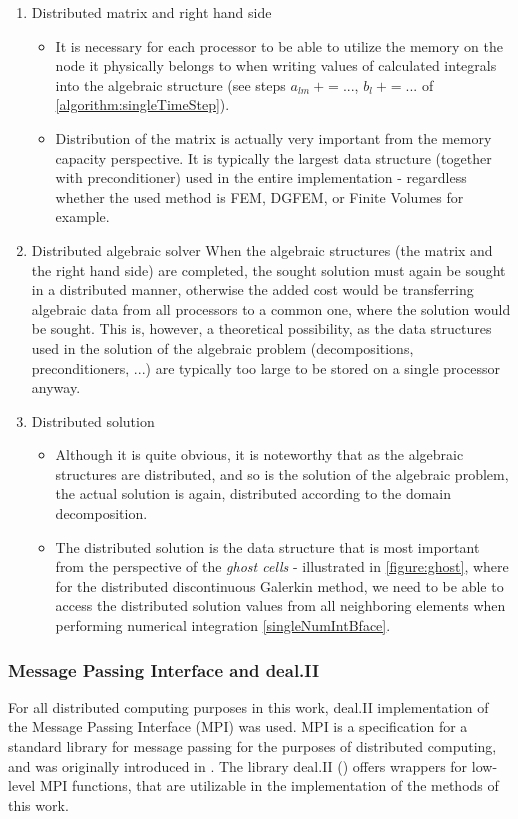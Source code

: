 \begin{enumerate}
	\item
		Distributed matrix and right hand side
		\begin{itemize}
			\item It is necessary for each processor to be able to utilize the memory on the node it physically belongs to when writing values of calculated integrals into the algebraic structure (see steps $a_{lm}\ +=...$, $b_{l}\ +=...$ of \cref{algorithm:singleTimeStep}).
			\item Distribution of the matrix is actually very important from the memory capacity perspective. It is typically the largest data structure (together with preconditioner) used in the entire implementation - regardless whether the used method is FEM, DGFEM, or Finite Volumes for example.
		\end{itemize}
	\item
		Distributed algebraic solver
	When the algebraic structures (the matrix and the right hand side) are completed, the sought solution must again be sought in a distributed manner, otherwise the added cost would be transferring algebraic data from all processors to a common one, where the solution would be sought. This is, however, a theoretical possibility, as the data structures used in the solution of the algebraic problem (decompositions, preconditioners, ...) are typically too large to be stored on a single processor anyway.
	\item
		Distributed solution
		\begin{itemize}
			\item Although it is quite obvious, it is noteworthy that as the algebraic structures are distributed, and so is the solution of the algebraic problem, the actual solution is again, distributed according to the domain decomposition.
			\item The distributed solution is the data structure that is most important from the perspective of the \textit{ghost cells} - illustrated in \cref{figure:ghost}, where for the distributed discontinuous Galerkin method, we need to be able to access the distributed solution values from all neighboring elements when performing numerical integration \cref{singleNumIntBface}.
		\end{itemize}
\end{enumerate}
\subsubsection{Message Passing Interface and deal.II}
For all distributed computing purposes in this work, deal.II implementation of the Message Passing Interface (MPI) was used. MPI is a specification for a standard library for message passing for the purposes of distributed computing, and was originally introduced in \cite{mpi}. The library deal.II (\cite{deal}) offers wrappers for low-level MPI functions, that are utilizable in the implementation of the methods of this work.
